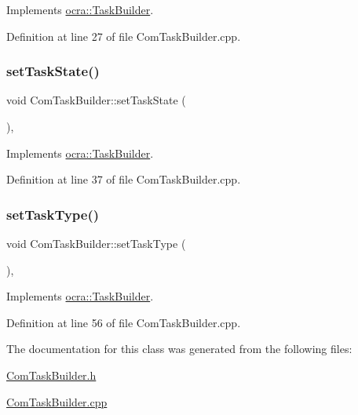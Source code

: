 Implements \hyperlink{classocra_1_1TaskBuilder_a7a2c8bcc5d95160d0e48806a2648f1a5}{ocra\+::\+Task\+Builder}.



Definition at line 27 of file Com\+Task\+Builder.\+cpp.

\hypertarget{classocra_1_1ComTaskBuilder_ab514d4644f7dfeec3ae84a5b0b8bbc34}{}\label{classocra_1_1ComTaskBuilder_ab514d4644f7dfeec3ae84a5b0b8bbc34} 
\subsubsection{\texorpdfstring{set\+Task\+State()}{setTaskState()}}
{\footnotesize\ttfamily void Com\+Task\+Builder\+::set\+Task\+State (\begin{DoxyParamCaption}{ }\end{DoxyParamCaption})\hspace{0.3cm}{\ttfamily [protected]}, {\ttfamily [virtual]}}



Implements \hyperlink{classocra_1_1TaskBuilder_a7b44bfa101566ea4400e2d9bfdb9ff32}{ocra\+::\+Task\+Builder}.



Definition at line 37 of file Com\+Task\+Builder.\+cpp.

\hypertarget{classocra_1_1ComTaskBuilder_af9cfac995156297324ccbee1900f891c}{}\label{classocra_1_1ComTaskBuilder_af9cfac995156297324ccbee1900f891c} 
\subsubsection{\texorpdfstring{set\+Task\+Type()}{setTaskType()}}
{\footnotesize\ttfamily void Com\+Task\+Builder\+::set\+Task\+Type (\begin{DoxyParamCaption}{ }\end{DoxyParamCaption})\hspace{0.3cm}{\ttfamily [protected]}, {\ttfamily [virtual]}}



Implements \hyperlink{classocra_1_1TaskBuilder_a1a979fc495be6dc30483aa8fd0ff2650}{ocra\+::\+Task\+Builder}.



Definition at line 56 of file Com\+Task\+Builder.\+cpp.



The documentation for this class was generated from the following files\+:\begin{DoxyCompactItemize}
\item 
\hyperlink{ComTaskBuilder_8h}{Com\+Task\+Builder.\+h}\item 
\hyperlink{ComTaskBuilder_8cpp}{Com\+Task\+Builder.\+cpp}\end{DoxyCompactItemize}
